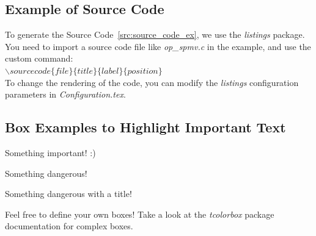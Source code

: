 \subsection{Example of Source Code}

To generate the Source Code~\ref{src:source_code_ex}, we use the \textit{listings} package.
You need to import a source code file like \textit{op\_spmv.c} in the example, and use the custom command: \\
$\backslash sourcecode \{ file \}\{ title \}\{ label \}\{ position \}$ \\
To change the rendering of the code, you can modify the \textit{listings} configuration parameters in \textit{Configuration.tex}.


\subsection{Box Examples to Highlight Important Text}

\begin{tcolorbox}
    Something important!
    \tcblower
    :)
\end{tcolorbox}

\begin{tcolorbox}[colback=red!5!white, colframe=red!75!black]
    Something dangerous!
\end{tcolorbox}

\begin{tcolorbox}[colback=red!5!white, colframe=red!75!black, title=Warning]
    Something dangerous with a title!
\end{tcolorbox}

\begin{tcolorbox}[colback=blue!5!white, colframe=blue!75!black, title=Conclusion]
    Feel free to define your own boxes! Take a look at the \textit{tcolorbox} package documentation for complex boxes.
\end{tcolorbox}